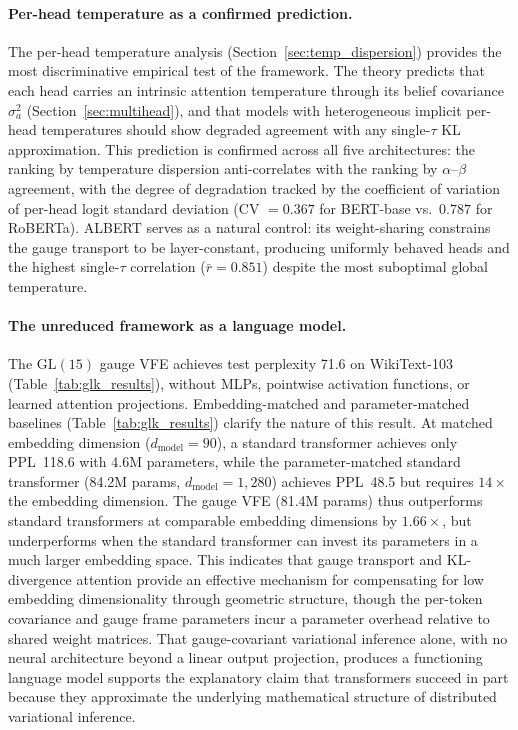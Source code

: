 \documentclass[twoside,11pt]{article}
\begin{document}
\paragraph{Per-head temperature as a confirmed prediction.} The per-head temperature analysis (Section~\ref{sec:temp_dispersion}) provides the most discriminative empirical test of the framework. The theory predicts that each head carries an intrinsic attention temperature through its belief covariance $\sigma_a^2$ (Section~\ref{sec:multihead}), and that models with heterogeneous implicit per-head temperatures should show degraded agreement with any single-$\tau$ KL approximation. This prediction is confirmed across all five architectures: the ranking by temperature dispersion anti-correlates with the ranking by $\alpha$--$\beta$ agreement, with the degree of degradation tracked by the coefficient of variation of per-head logit standard deviation (CV $= 0.367$ for BERT-base vs.\ $0.787$ for RoBERTa). ALBERT serves as a natural control: its weight-sharing constrains the gauge transport to be layer-constant, producing uniformly behaved heads and the highest single-$\tau$ correlation ($\bar{r} = 0.851$) despite the most suboptimal global temperature.

\paragraph{The unreduced framework as a language model.} The $\mathrm{GL}(15)$ gauge VFE achieves test perplexity 71.6 on WikiText-103 (Table~\ref{tab:glk_results}), without MLPs, pointwise activation functions, or learned attention projections. Embedding-matched and parameter-matched baselines (Table~\ref{tab:glk_results}) clarify the nature of this result. At matched embedding dimension ($d_{\text{model}} = 90$), a standard transformer achieves only PPL~118.6 with 4.6M parameters, while the parameter-matched standard transformer (84.2M params, $d_{\text{model}} = 1{,}280$) achieves PPL~48.5 but requires $14\times$ the embedding dimension. The gauge VFE (81.4M params) thus outperforms standard transformers at comparable embedding dimensions by $1.66\times$, but underperforms when the standard transformer can invest its parameters in a much larger embedding space. This indicates that gauge transport and KL-divergence attention provide an effective mechanism for compensating for low embedding dimensionality through geometric structure, though the per-token covariance and gauge frame parameters incur a parameter overhead relative to shared weight matrices. That gauge-covariant variational inference alone, with no neural architecture beyond a linear output projection, produces a functioning language model supports the explanatory claim that transformers succeed in part because they approximate the underlying mathematical structure of distributed variational inference.
\end{document}
